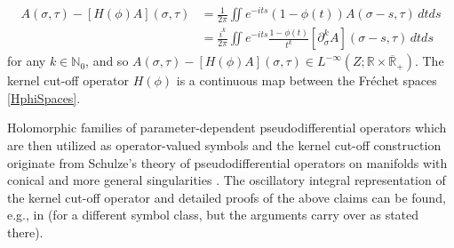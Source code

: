 \documentclass[reqno]{amsart}
\numberwithin{equation}{section}
\theoremstyle{definition}
\def\N{\mathbb N}
\def\R{\mathbb R}
\begin{document}
\begin{align*}
A(\sigma,\tau) - [H(\phi)A](\sigma,\tau) &= \frac{1}{2\pi} \iint e^{-its}(1-\phi(t))A(\sigma-s,\tau)\,dt ds \\
&= \frac{i^k}{2\pi} \iint e^{-its}\frac{1-\phi(t)}{t^k}[\partial^k_{\sigma}A](\sigma-s,\tau)\,dt ds
\end{align*}
for any $k \in \N_0$, and so $A(\sigma,\tau) - [H(\phi)A](\sigma,\tau) \in L^{-\infty}(Z;\R\times\overline{\R}_+)$. The kernel cut-off operator $H(\phi)$ is a continuous map between the Fr{\'e}chet spaces \eqref{HphiSpaces}.

Holomorphic families of parameter-dependent pseudodifferential operators which are then utilized as operator-valued symbols and the kernel cut-off construction originate from Schulze's theory of pseudodifferential operators on manifolds with conical and more general singularities \cite{SchuNH}. The oscillatory integral representation of the kernel cut-off operator and detailed proofs of the above claims can be found, e.g., in \cite[Section~3]{KrainerVolterra} (for a different symbol class, but the arguments carry over as stated there).
\end{document}
